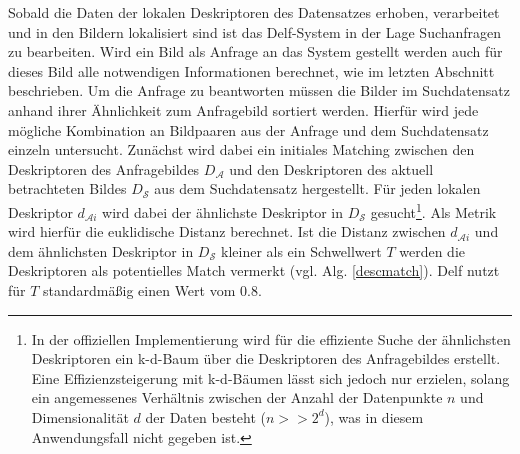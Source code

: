 Sobald die Daten der lokalen Deskriptoren des Datensatzes erhoben, verarbeitet und in den Bildern lokalisiert sind ist das Delf-System in der Lage Suchanfragen zu bearbeiten. Wird ein Bild als Anfrage an das System gestellt werden auch für dieses Bild alle notwendigen Informationen berechnet, wie im letzten Abschnitt beschrieben. Um die Anfrage zu beantworten müssen die Bilder im Suchdatensatz anhand ihrer Ähnlichkeit zum Anfragebild sortiert werden. Hierfür wird jede mögliche Kombination an Bildpaaren aus der Anfrage und dem Suchdatensatz einzeln untersucht. Zunächst wird dabei ein initiales Matching zwischen den Deskriptoren des Anfragebildes $D_\mathcal{A}$ und den Deskriptoren des aktuell betrachteten Bildes $D_\mathcal{S}$ aus dem Suchdatensatz hergestellt. Für jeden lokalen Deskriptor $d_{\mathcal{A}i}$ wird dabei der ähnlichste Deskriptor in $D_\mathcal{S}$ gesucht\footnote{In der offiziellen Implementierung wird für die effiziente Suche der ähnlichsten Deskriptoren ein k-d-Baum \cite{kd_tree} über die Deskriptoren des Anfragebildes erstellt. Eine Effizienzsteigerung mit k-d-Bäumen lässt sich jedoch nur erzielen, solang ein angemessenes Verhältnis zwischen der Anzahl der Datenpunkte $n$ und Dimensionalität $d$ der Daten besteht ($n >> 2^d$)\cite{curse_of_dim}, was in diesem Anwendungsfall nicht gegeben ist.}. Als Metrik wird hierfür die euklidische Distanz berechnet. Ist die Distanz zwischen $d_{\mathcal{A}i}$ und dem ähnlichsten Deskriptor in $D_\mathcal{S}$ kleiner als ein Schwellwert $T$ werden die Deskriptoren als potentielles Match vermerkt (vgl. Alg. \ref{descmatch}).
Delf nutzt für $T$ standardmäßig einen Wert vom $0.8$.

